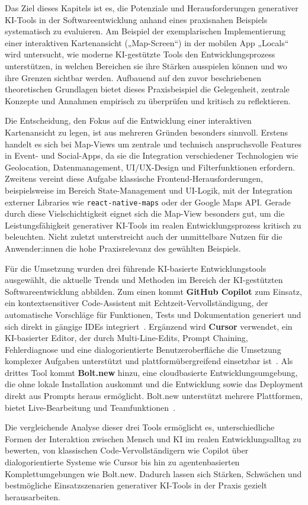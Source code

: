 \label{sec:zielsetzung-vorgehen}

Das Ziel dieses Kapitels ist es, die Potenziale und Herausforderungen
generativer KI-Tools in der Softwareentwicklung anhand eines praxisnahen
Beispiels systematisch zu evaluieren. Am Beispiel der exemplarischen
Implementierung einer interaktiven Kartenansicht („Map-Screen“) in der mobilen
App „Locals“ wird untersucht, wie moderne KI-gestützte Tools den
Entwicklungsprozess unterstützen, in welchen Bereichen sie ihre Stärken
ausspielen können und wo ihre Grenzen sichtbar werden. Aufbauend auf den zuvor
beschriebenen theoretischen Grundlagen bietet dieses Praxisbeispiel die
Gelegenheit, zentrale Konzepte und Annahmen empirisch zu überprüfen und
kritisch zu reflektieren.

Die Entscheidung, den Fokus auf die Entwicklung einer interaktiven
Kartenansicht zu legen, ist aus mehreren Gründen besonders sinnvoll. Erstens
handelt es sich bei Map-Views um zentrale und technisch anspruchsvolle Features
in Event- und Social-Apps, da sie die Integration verschiedener Technologien
wie Geolocation, Datenmanagement, UI/UX-Design und Filterfunktionen erfordern.
Zweitens vereint diese Aufgabe klassische Frontend-Herausforderungen,
beispielsweise im Bereich State-Management und UI-Logik, mit der Integration
externer Libraries wie \texttt{react-native-maps} oder der Google Maps API.
Gerade durch diese Vielschichtigkeit eignet sich die Map-View besonders gut, um
die Leistungsfähigkeit generativer KI-Tools im realen Entwicklungsprozess
kritisch zu beleuchten. Nicht zuletzt unterstreicht auch der unmittelbare
Nutzen für die Anwender:innen die hohe Praxisrelevanz des gewählten Beispiels.

Für die Umsetzung wurden drei führende KI-basierte Entwicklungstools
ausgewählt, die aktuelle Trends und Methoden im Bereich der KI-gestützten
Softwareentwicklung abbilden. Zum einen kommt \textbf{GitHub Copilot} zum
Einsatz, ein kontextsensitiver Code-Assistent mit Echtzeit-Vervollständigung,
der automatische Vorschläge für Funktionen, Tests und Dokumentation generiert
und sich direkt in gängige IDEs integriert~\cite{github_copilot_2025}.
Ergänzend wird \textbf{Cursor} verwendet, ein KI-basierter Editor, der durch
Multi-Line-Edits, Prompt Chaining, Fehlerdiagnose und eine dialogorientierte
Benutzeroberfläche die Umsetzung komplexer Aufgaben unterstützt und
plattformübergreifend einsetzbar ist~\cite{cursor_welcome_2025}. Als drittes
Tool kommt \textbf{Bolt.new} hinzu, eine cloudbasierte Entwicklungsumgebung,
die ohne lokale Installation auskommt und die Entwicklung sowie das Deployment
direkt aus Prompts heraus ermöglicht. Bolt.new unterstützt mehrere Plattformen,
bietet Live-Bearbeitung und Teamfunktionen~\cite{bolt_support_2025}.

Die vergleichende Analyse dieser drei Tools ermöglicht es, unterschiedliche
Formen der Interaktion zwischen Mensch und KI im realen Entwicklungsalltag zu
bewerten, von klassischen Code-Vervollständigern wie Copilot über
dialogorientierte Systeme wie Cursor bis hin zu agentenbasierten
Komplettumgebungen wie Bolt.new. Dadurch lassen sich Stärken, Schwächen und
bestmögliche Einsatzszenarien generativer KI-Tools in der Praxis gezielt
herausarbeiten.
